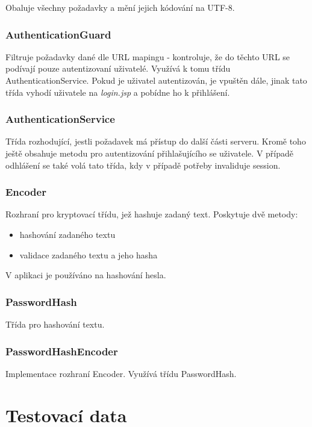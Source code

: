 \documentclass[
12pt,
a4paper,
pdftex,
czech,
titlepage
]{report}
\begin{document}
Obaluje všechny požadavky a mění jejich kódování na UTF-8.

\subsection{AuthenticationGuard}

Filtruje požadavky dané dle URL mapingu - kontroluje, že do těchto URL se podívají pouze autentizovaní uživatelé. Využívá k tomu třídu AuthenticationService. Pokud je uživatel autentizován, je vpuštěn dále, jinak tato třída vyhodí uživatele na \textit{login.jsp} a pobídne ho k přihlášení.

\subsection{AuthenticationService}

Třída rozhodující, jestli požadavek má přístup do další části serveru. Kromě toho ještě obsahuje metodu pro autentizování přihlašujícího se uživatele. V případě odhlášení se také volá tato třída, kdy v případě potřeby invaliduje session.

\subsection{Encoder}

Rozhraní pro kryptovací třídu, jež hashuje zadaný text. Poskytuje dvě metody:
\begin{itemize}
\item hashování zadaného textu
\item validace zadaného textu a jeho hasha
\end{itemize}

V aplikaci je používáno na hashování hesla.

\subsection{PasswordHash}

Třída pro hashování textu. 

\subsection{PasswordHashEncoder}

Implementace rozhraní Encoder. Využívá třídu PasswordHash.



\chapter{Testovací data}
\end{document}
